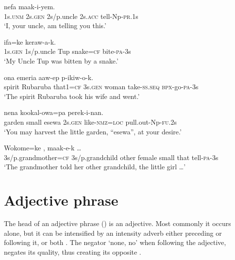 \ea%
\label{ex:4:x835}
\gll {}    nefa  maak-i-yem. \\
  1s.\textsc{unm}  2s.\textsc{gen}  2s/p.uncle  2s.\textsc{acc}  tell-Np-\textsc{pr}.1s    \\
\glt`I, your uncle, am telling you this.'
\z

\ea%
\label{ex:4:x836}
\gll {}    ifa=ke  keraw-a-k. \\
  1s.\textsc{gen}  1s/p.uncle  Tup  snake=\textsc{cf}  bite-\textsc{pa}-3s    \\
\glt`My Uncle Tup was bitten by a snake.'
\z

\ea%
\label{ex:4:x837}
\gll {}     ona  emeria  aaw-ep  p-ikiw-o-k.\\
    spirit  Rubaruba  that1=\textsc{cf}  3s.\textsc{gen}  woman  take-\textsc{ss}.\textsc{seq}  \textsc{bpx}-go-\textsc{pa}-3s  \\
\glt`The spirit Rubaruba took his wife and went.'
\z

\ea%
\label{ex:4:x838}
\gll {}     nena  kookal-owa=pa  perek-i-nan.\\
garden  small  esewa  2s.\textsc{gen}  like-\textsc{nmz}=\textsc{loc}   pull.out-Np-\textsc{fu}.2s     \\
\glt`You may harvest the little garden, ``esewa'', at your desire.'
\z

\ea%
\label{ex:4:x839}
\gll Wokome=ke   ,      maak-e-k  {\dots}\\
    3s/p.grandmother=\textsc{cf}  3s/p.grandchild  other  female  small  that  tell-\textsc{pa}-3s  \\
\glt`The grandmother told her other grandchild, the little girl {\dots}'
\z

\section{Adjective phrase} \label{sec:4.2}
{}
The head of an adjective phrase () is an adjective. Most commonly it occurs alone, but it can be intensified by an intensity adverb either preceding or following it, or both .  The negator  `none, no' when following the adjective, negates its quality, thus creating its opposite .  

